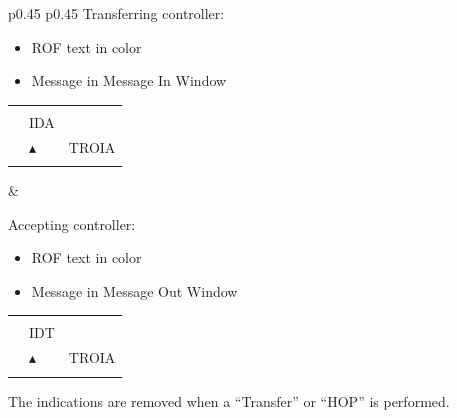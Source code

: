 \documentclass[a4paper,oneside,11pt]{memoir}
\begin{document}
\begin{longtable}{p{} p{}}
  Transferring controller:

  \begin{itemize}
    \item ROF text in  color
    \item Message in Message In Window
  \end{itemize}

  \begin{tabular}{
    >{\columncolor{Flight Highlight}}l 
    >{\columncolor{Flight Highlight}}l
    >{\columncolor{Flight Highlight}}l }
    {\color{Proposition In} ROF} & {\color{Coordination} }       & {\color{Assumed} }      \\
    {\color{Assumed} ABC123} & {\color{Coordination} IDA}       & {\color{Assumed} }      \\
    {\color{Assumed} 100}    & {\color{Assumed} $\blacktriangle$} & {\color{Assumed} TROIA} \\
    {\color{Assumed} 180}    & {\color{Assumed} }          & {\color{Assumed} }     
  \end{tabular}
  &
  
  Accepting controller:

  \begin{itemize}
    \item ROF text in  color
    \item Message in Message Out Window
  \end{itemize}

  \begin{tabular}{
    >{\columncolor{Flight Highlight}}l 
    >{\columncolor{Flight Highlight}}l
    >{\columncolor{Flight Highlight}}l }
    {\color{Proposition In} ROF}  & {\color{Coordination} }                 & {\color{Coordination} }      \\
    {\color{Coordination} ABC123} & {\color{Coordination} IDT}              & {\color{Coordination} }      \\
    {\color{Coordination} 100}    & {\color{Coordination} $\blacktriangle$} & {\color{Coordination} TROIA} \\
    {\color{Coordination} 180}    & {\color{Coordination} }                 & {\color{Coordination} }     
  \end{tabular}

\end{longtable}

The indications are removed when a “Transfer” or “HOP” is performed.
\end{document}
